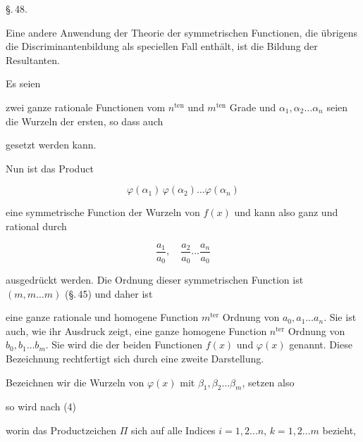 
\begin{center}
\S.\,48.

\end{center}

Eine andere Anwendung der Theorie der symmetrischen Functionen, die übrigens die Discriminantenbildung als speciellen Fall enthält, ist die Bildung der Resultanten.

Es seien



zwei ganze rationale Functionen vom $n^{\mathrm{ten}}$ und $m^{\mathrm{ten}}$ Grade und $\alpha_1, \alpha_2 \ldots \alpha_n$ seien die Wurzeln der ersten, so dass auch


gesetzt werden kann.

Nun ist das Product

\[
\varphi(\alpha_1)\,\varphi(\alpha_2) \ldots \varphi(\alpha_n)
\]

eine symmetrische Function der Wurzeln von $f(x)$ und kann also ganz und rational durch

\[
\frac{a_1}{a_0}, \quad \frac{a_2}{a_0} \ldots \frac{a_n}{a_0}
\]

ausgedrückt werden. Die Ordnung dieser symmetrischen Function ist $(m, m \ldots m)$ (\S.\,45) und daher ist


eine ganze rationale und homogene Function $m^{\mathrm{ter}}$ Ordnung von $a_0, a_1 \ldots a_n$. Sie ist auch, wie ihr Ausdruck zeigt, eine ganze homogene Function $n^{\mathrm{ter}}$ Ordnung von $b_0, b_1 \ldots b_m$. Sie wird die  der beiden Functionen $f(x)$ und $\varphi(x)$ genannt. Diese Bezeichnung rechtfertigt sich durch eine zweite Darstellung.

Bezeichnen wir die Wurzeln von $\varphi(x)$ mit $\beta_1, \beta_2 \ldots \beta_m$, setzen also


so wird nach (4)


worin das Productzeichen $\Pi$ sich auf alle Indices $i = 1, 2 \ldots n$, $k = 1, 2 \ldots m$ bezieht,
